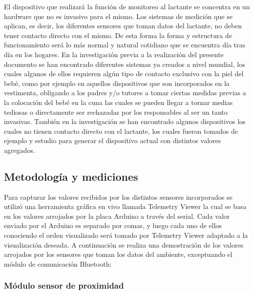 \documentclass{IEEEtran}
\begin{document}
		El dispositivo que realizará la función de monitoreo al lactante se concentra en un hardware que no es invasivo para el mismo. Los sistemas de medición que se aplican, es decir, los diferentes sensores que toman datos del lactante, no deben tener contacto directo con el mismo. De esta forma la forma y estructura de funcionamiento será lo más normal y natural cotidiano que se encuentra día tras día en los hogares. En la investigación previa a la realización del presente documento se han encontrado diferentes sistemas ya creados a nivel mundial, los cuales algunos de ellos requieren algún tipo de contacto exclusivo con la piel del bebé, como por ejemplo en aquellos dispositivos que son incorporados en la vestimenta, obligando a los padres y/o tutores a tomar ciertas medidas previas a la colocación del bebé en la cuna las cuales se pueden llegar a tornar medias tediosas o directamente ser rechazadas por los responsables al ser un tanto invasivas. También en la investigación se han encontrado algunos dispositivos los cuales no tienen contacto directo con el lactante, los cuales fueron tomados de ejemplo y estudio para generar el dispositivo actual con distintos valores agregados.

		\subsection{Metodología y mediciones}
			
			Para capturar los valores recibidos por los distintos sensores incorporados se utilizó una herramienta gráfica en vivo llamada Telemetry Viewer \cite{telemetryviewer} la cual se basa en los valores arrojados por la placa Arduino a través del serial. Cada valor enviado por el Arduino es separado por comas, y luego cada uno de ellos conociendo el orden visualizado será tomado por Telemetry Viewer adaptado a la visualización deseada. A continuación se realiza una demostración de los valores arrojados por los sensores que toman los datos del ambiente, exceptuando el módulo de comunicación Bluetooth:

			\subsubsection{Módulo sensor de proximidad}
\end{document}
